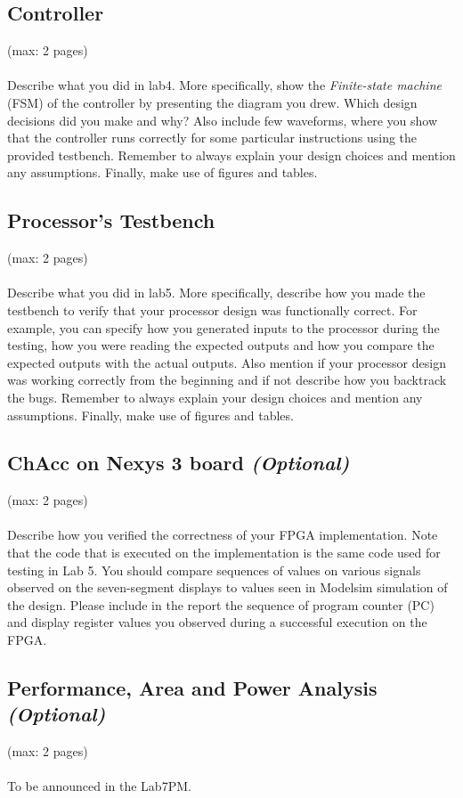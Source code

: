 \documentclass[a4paper,11pt]{article}
\begin{document}
\subsection{Controller}
(max: 2 pages)
\\\\
Describe what you did in lab4. More specifically, show the \emph{Finite-state machine} (FSM) of the controller by presenting the diagram you drew. Which design decisions did you make and why? Also include few waveforms, where you show that the controller runs correctly for some particular instructions using the provided testbench. Remember to always explain your design choices and mention any assumptions. Finally, make use of figures and tables. 

\subsection{Processor's Testbench}
(max: 2 pages)
\\\\
Describe what you did in lab5. More specifically, describe how you made the testbench to verify that your processor design was functionally correct. For example, you can specify how you generated inputs to the processor during the testing, how you were reading the expected outputs and how you compare the expected outputs with the actual outputs. Also mention if your processor design was working correctly from the beginning and if not describe how you backtrack the bugs. Remember to always explain your design choices and mention any assumptions. Finally, make use of figures and tables. 

\subsection{ChAcc on Nexys 3 board \emph{(Optional)}}
(max: 2 pages)
\\\\
Describe how you verified the correctness of your FPGA implementation. Note that the code that is executed on the implementation is the same code used for testing in Lab 5. You should compare sequences of values on various signals observed on the seven-segment displays to values seen in Modelsim simulation of the design. Please include in the report the sequence of program counter (PC) and display register values you observed during a successful execution on the FPGA. 

\subsection{Performance, Area and Power Analysis \emph{(Optional)}}
(max: 2 pages)
\\\\
To be announced in the Lab7PM.
\end{document}
